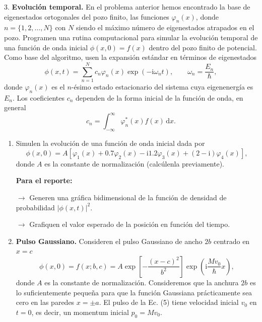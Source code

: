  \newpage
\begin{pregunta}{3.}
\textbf{Evolución temporal.} En el problema anterior hemos encontrado la base de eigenestados ortogonales del pozo finito, las funciones $\varphi_n(x)$, donde $n = \{1, 2, \ldots, N\}$ con $N$ siendo el máximo número de eigenestados atrapados en el pozo. Programen una rutina computacional para simular la evolución temporal de una función de onda inicial $\phi(x,0) = f(x)$ dentro del pozo finito de potencial. Como base del algoritmo, usen la expansión estándar en términos de eigenestados
\begin{equation}
\phi(x,t) = \sum_{n=1}^{N} c_n \varphi_n(x) \exp(-\mathrm{i}\omega_n t), \qquad \omega_n = \frac{E_n}{\hbar}, \tag{2}
\end{equation}
donde $\varphi_n(x)$ es el $n$-ésimo estado estacionario del sistema cuya eigenenergía es $E_n$. Los coeficientes $c_n$ dependen de la forma inicial de la función de onda, en general
\begin{equation}
c_n = \int_{-\infty}^{\infty} \varphi_n^{*}(x) f(x) \, \mathrm{d}x. \tag{3}
\end{equation}
 
\begin{enumerate}
\item[a)] Simulen la evolución de una función de onda inicial dada por
\begin{equation}
\phi(x,0) = A \left[ \varphi_1(x) + 0.7\varphi_2(x) - \mathrm{i}1.2\varphi_3(x) + (2 - \mathrm{i})\varphi_4(x) \right], \tag{4}
\end{equation}
donde $A$ es la constante de normalización (calcúlenla previamente).
 
\textbf{Para el reporte:}
 
$\rightarrow$ Generen una gráfica bidimensional de la función de densidad de probabilidad $|\phi(x,t)|^2$.
 
$\rightarrow$ Grafiquen el valor esperado de la posición en función del tiempo.
 
\item[b)] \textbf{Pulso Gaussiano.} Consideren el pulso Gaussiano de ancho $2b$ centrado en $x = c$
\begin{equation}
\phi(x,0) = f(x; b, c) = A \exp\left[ -\frac{(x-c)^2}{b^2} \right] \exp\left( \mathrm{i}\frac{M v_0}{\hbar} x \right), \tag{5}
\end{equation}
donde $A$ es la constante de normalización. Consideremos que la anchura $2b$ es lo suficientemente pequeña para que la función Gaussiana prácticamente sea cero en las paredes $x = \pm a$. El pulso de la Ec. (5) tiene velocidad inicial $v_0$ en $t = 0$, es decir, un momentum inicial $p_0 = M v_0$.
 

\end{enumerate}
\end{pregunta}
